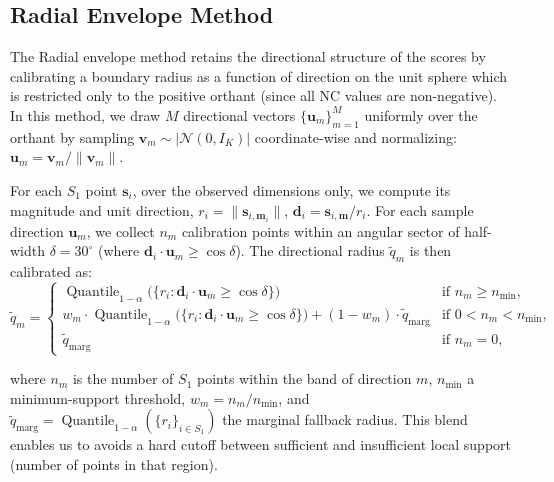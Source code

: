 
\subsection{Radial Envelope Method}
\label{sec3.4.2: radial}
The Radial envelope method retains the directional structure of the scores by calibrating a boundary radius as a 
function of direction on the unit sphere which is restricted only to the positive orthant (since all NC values are 
non-negative). In this method, we draw $M$ directional vectors $\{\mathbf{u}_m\}_{m=1}^M$ uniformly over the orthant by 
sampling $\mathbf{v}_m \sim |\mathcal{N}(0, I_K)|$ coordinate-wise and normalizing: $\mathbf{u}_m = \mathbf{v}_m / \|
\mathbf{v}_m\|$.

For each $S_1$ point $\mathbf{s}_i$, over the observed dimensions only, we compute its magnitude and unit direction, 
$r_i = \|\mathbf{s}_{i,\mathbf{m}_i}\|$, $\mathbf{d}_i = \mathbf{s}_{i,\mathbf{m}}/r_i$. For each sample direction 
$\mathbf{u}_m$, we collect $n_m$ calibration points within an angular sector of half-width $\delta = 30^\circ$ (where 
$\mathbf{d}_i \cdot \mathbf{u}_m \ge \cos\delta$). The directional radius $\tilde{q}_m$ is then calibrated as:
\begin{equation*}
\tilde{q}_m = \begin{cases}
\operatorname{Quantile}_{1-\alpha}\big(\{r_i : \mathbf{d}_i \cdot \mathbf{u}_m \ge \cos\delta\}\big) & \text{if } 
n_m \ge n_{\min}, \\
w_m \cdot \operatorname{Quantile}_{1-\alpha}\big(\{r_i : \mathbf{d}_i \cdot \mathbf{u}_m \ge \cos\delta\}\big) + 
(1-w_m) \cdot \tilde{q}_{\text{marg}} & \text{if } 0 < n_m < n_{\min}, \\
\tilde{q}_{\text{marg}} & \text{if } n_m = 0,
\end{cases}
\end{equation*}

where $n_m$ is the number of $S_1$ points within the band of direction $m$, $n_{\min}$ a minimum-support threshold, $w_m = 
n_m/n_{\min}$, and $\tilde{q}_{\text{marg}} = \operatorname{Quantile}_{1-\alpha}(\{r_i\}_{i \in S_1})$ the marginal fallback 
radius. This blend enables us to avoids a hard cutoff between sufficient and insufficient local support (number of points in 
that region).

